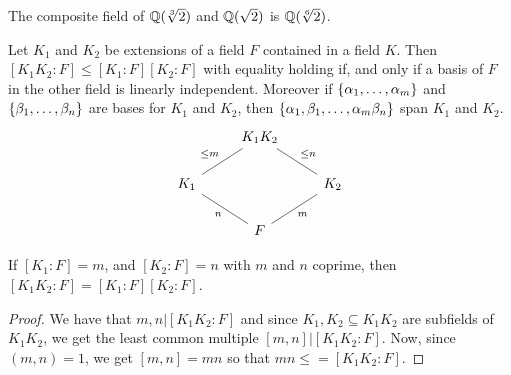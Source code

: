   \begin{example}\label{example_8.10}
    The composite field of $\mathbb{Q}(\sqrt[3]{2})$ and $\mathbb{Q}(\sqrt{2})$ is
    $\mathbb{Q}(\sqrt[6]{2})$.
  \end{example}

  \begin{lemma}\label{lemma_8.2.8}
    Let $K_1$ and $K_2$ be extensions of a field $F$ contained in a field  $K$.
    Then  $[K_1K_2:F] \leq [K_1:F][K_2:F]$ with equality holding if, and only
    if a basis of $F$ in the other field is linearly independent. Moreover if
    $\{\alpha_1, \dots, \alpha_m\}$ and $\{\beta_1, \dots, \beta_n\}$ are bases for $K_1$ and
    $K_2$, then $\{\alpha_1,\beta_1, \dots, \alpha_m\beta_n\}$ span $K_1$ and $K_2$.
    \[\begin{tikzcd}
        & {K_1K_2} \\
      K_1 && K_2 \\
          & F
          \arrow["{\leq m}"', no head, from=1-2, to=2-1]
          \arrow["n"', no head, from=2-1, to=3-2]
          \arrow["m"', no head, from=3-2, to=2-3]
          \arrow["{\leq n}"', no head, from=2-3,to=1-2]
    \end{tikzcd}\]
  \end{lemma}
  \begin{corollary}
    If $[K_1:F]=m$, and $[K_2:F]=n$ with $m$ and  $n$ coprime, then
    $[K_1K_2:F]=[K_1:F][K_2:F]$.
  \end{corollary}
  \begin{proof}
    We have that $m,n|[K_1K_2:F]$ and since $K_1,K_2 \subseteq K_1K_2$ are
    subfields of $K_1K_2$, we get the least common multiple $[m,n]|[K_1K_2:F]$.
    Now, since $(m,n)=1$, we get $[m,n]=mn$ so that $mn \leq =[K_1K_2:F]$.
  \end{proof}
